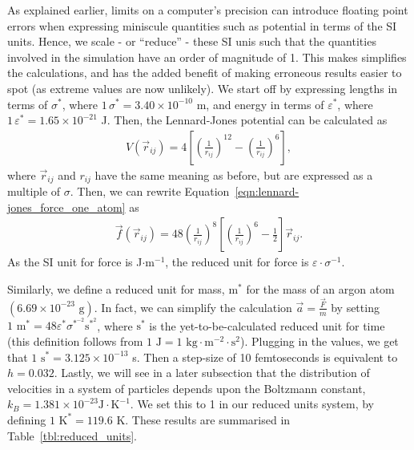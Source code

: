 \documentclass[../Main.tex]{subfiles}
\begin{document}
As explained earlier, limits on a computer's precision can introduce floating point errors when expressing miniscule quantities such as potential in terms of the SI units. Hence, we scale - or ``reduce'' - these SI unis such that the quantities involved in the simulation have an order of magnitude of 1. This makes simplifies the calculations, and has the added benefit of making erroneous results easier to spot (as extreme values are now unlikely). We start off by expressing lengths in terms of $\sigma^{*}$, where $1\, \sigma^{*} = 3.40 \times 10^{-10}$ m, and energy in terms of $\varepsilon^{*}$, where $1\, \varepsilon^{*}= 1.65 \times 10^{-21}$ J. Then, the Lennard-Jones potential can be calculated as
\begin{align}
	V\left(\vec{r}_{ij}\right) = 4 \left[ \left( \frac{1}{r_{ij}}\right)^{12} - \left( \frac{1}{r_{ij}}\right)^{6} \right], \label{eqn:lennard-jones_potential_reduced}
\end{align}
where $\vec{r}_{ij}$ and $r_{ij}$ have the same meaning as before, but are expressed as a multiple of $\sigma$.
Then, we can rewrite Equation~\ref{eqn:lennard-jones_force_one_atom} as
\begin{align}
\vec{f}\left(\vec{r}_{ij}\right) = 48\left( \frac{1}{r_{ij}}\right)^{8} \left[ \left( \frac{1}{r_{ij}}\right)^{6} - \frac{1}{2}\right]\vec{r}_{ij}. \label{eqn:lennard-jones_force_reduced_one_atom}
\end{align}
As the SI unit for force is J$\cdot\mbox{m}^{-1}$, the reduced unit for force is $\varepsilon\cdot\sigma^{-1}$.

Similarly, we define a reduced unit for mass, $\mbox{m}^{*}$ for the mass of an argon atom $\left(6.69 \times 10^{-23}\mbox{ g}\right)$. In fact, we can simplify the calculation $\vec{a} = \frac{\vec{F}}{m}$ by setting $1\mbox{ m}^{*} = 48\varepsilon^{*}\sigma^{*^{-2}}\mbox{s}^{*^{2}}$, where $\mbox{s}^{*}$ is the yet-to-be-calculated reduced unit for time (this definition follows from $1\mbox{ J} = 1 \mbox{ kg}\cdot\mbox{m}^{-2}\cdot \mbox{s}^{2}$). Plugging in the values, we get that $1 \mbox{ s}^{*} = 3.125 \times 10^{-13}$ s. Then a step-size of 10 femtoseconds is equivalent to $h = 0.032$.
Lastly, we will see in a later subsection that the distribution of velocities in a system of particles depends upon the Boltzmann constant, $k_{B} = 1.381 \times 10^{-23} \mbox{J}\cdot\mbox{K}^{-1}$. We set this to 1 in our reduced units system, by defining $1 \mbox{ K}^{*} = 119.6\mbox{ K}$. These results are summarised in Table~\ref{tbl:reduced_units}.
\end{document}

